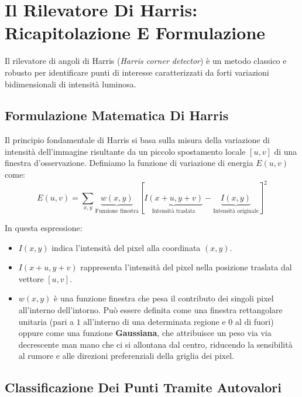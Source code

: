 ﻿\documentclass[11pt, a4paper]{article}
\begin{document}
\newpage

\section{Il Rilevatore Di Harris: Ricapitolazione E Formulazione}

Il rilevatore di angoli di Harris (\emph{Harris corner detector}) è un metodo classico e robusto per identificare punti di interesse caratterizzati da forti variazioni bidimensionali di intensità luminosa.

\subsection{Formulazione Matematica Di Harris}

Il principio fondamentale di Harris si basa sulla misura della variazione di intensità dell'immagine risultante da un piccolo spostamento locale $[u, v]$ di una finestra d'osservazione. Definiamo la funzione di variazione di energia $E(u, v)$ come:
\[ E(u, v) = \sum_{x, y} \underbrace{w(x, y)}_{\text{Funzione finestra}} \left[ \underbrace{I(x + u, y + v)}_{\text{Intensità traslata}} - \underbrace{I(x, y)}_{\text{Intensità originale}} \right]^2 \]

In questa espressione:
\begin{itemize}
    \item $I(x, y)$ indica l'intensità del pixel alla coordinata $(x, y)$.
    \item $I(x + u, y + v)$ rappresenta l'intensità del pixel nella posizione traslata dal vettore $[u, v]$.
    \item $w(x, y)$ è una funzione finestra che pesa il contributo dei singoli pixel all'interno dell'intorno. Può essere definita come una finestra rettangolare unitaria (pari a $1$ all'interno di una determinata regione e $0$ al di fuori) oppure come una funzione \textbf{Gaussiana}, che attribuisce un peso via via decrescente man mano che ci si allontana dal centro, riducendo la sensibilità al rumore e alle direzioni preferenziali della griglia dei pixel.
\end{itemize}


\subsection{Classificazione Dei Punti Tramite Autovalori}
\end{document}
